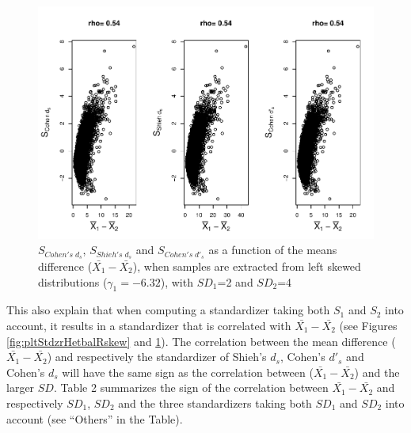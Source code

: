 \documentclass[
  man]{apa6}
\begin{document}
\begin{figure}
\centering
\includegraphics{Correlation_files/figure-latex/pltStdzrHetbalLskew-1.pdf}
\caption{\label{fig:pltStdzrHetbalLskew}\(S_{Cohen's \; d_s}\), \(S_{Shieh's \; d_s}\) and \(S_{Cohen's \; d'_s}\) as a function of the means difference (\(\bar{X_1}-\bar{X_2}\)), when samples are extracted from left skewed distributions (\(\gamma_1 = -6.32\)), with \(SD_1\)=2 and \(SD_2\)=4}
\end{figure}

This also explain that when computing a standardizer taking both \(S_1\) and \(S_2\) into account, it results in a standardizer that is correlated with \(\bar{X_1}-\bar{X_2}\) (see Figures \ref{fig:pltStdzrHetbalRskew} and \ref{fig:pltStdzrHetbalLskew}). The correlation between the mean difference (\(\bar{X_1}-\bar{X_2}\)) and respectively the standardizer of Shieh's \(d_s\), Cohen's \(d'_s\) and Cohen's \(d_s\) will have the same sign as the correlation between (\(\bar{X_1}-\bar{X_2}\)) and the larger \(SD\). Table 2 summarizes the sign of the correlation between \(\bar{X_1}-\bar{X_2}\) and respectively \(SD_1\), \(SD_2\) and the three standardizers taking both \(SD_1\) and \(SD_2\) into account (see \enquote{Others} in the Table).
\end{document}
